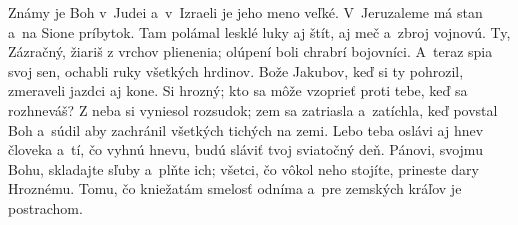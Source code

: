 Známy je Boh v~Judei
a~v~Izraeli je jeho meno veľké.
\versseparator
V~Jeruzaleme má stan
a~na Sione príbytok.
\versseparator
Tam polámal lesklé luky
aj štít, aj meč a~zbroj vojnovú.
\versseparator
Ty, Zázračný, žiariš
z vrchov plienenia;
olúpení boli chrabrí bojovníci.
\versseparator
A~teraz spia svoj sen,
ochabli ruky všetkých hrdinov.
\versseparator
Bože Jakubov, keď si ty pohrozil,
zmeraveli jazdci aj kone.
\versseparator
Si hrozný; kto sa môže vzoprieť proti tebe,
keď sa rozhneváš?
\versseparator
Z neba si vyniesol rozsudok;
zem sa zatriasla a~zatíchla,
\versseparator
keď povstal Boh a~súdil
aby zachránil všetkých tichých na zemi.
\versseparator
Lebo teba oslávi aj hnev človeka
a~tí, čo vyhnú hnevu, budú sláviť tvoj sviatočný deň.
\versseparator
Pánovi, svojmu Bohu, skladajte sľuby a~plňte ich;
všetci, čo vôkol neho stojíte, prineste dary Hroznému.
\versseparator
Tomu, čo kniežatám smelosť odníma
a~pre zemských kráľov je postrachom.